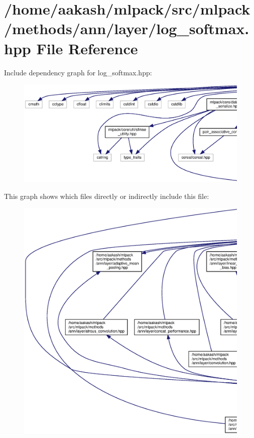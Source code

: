 \section{/home/aakash/mlpack/src/mlpack/methods/ann/layer/log\+\_\+softmax.hpp File Reference}
\label{log__softmax_8hpp}
Include dependency graph for log\+\_\+softmax.\+hpp\+:
\nopagebreak
\begin{figure}[H]
\begin{center}
\leavevmode
\includegraphics[width=350pt]{log__softmax_8hpp__incl}
\end{center}
\end{figure}
This graph shows which files directly or indirectly include this file\+:
\nopagebreak
\begin{figure}[H]
\begin{center}
\leavevmode
\includegraphics[width=350pt]{log__softmax_8hpp__dep__incl}
\end{center}
\end{figure}
